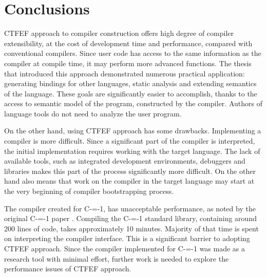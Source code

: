 \section{Conclusions}

CTFEF approach to compiler construction offers high degree of compiler extensibility, at the cost of development time and performance, compared with conventional compilers.
Since user code has access to the same information as the compiler at compile time, it may perform more advanced functions.
The thesis that introduced this approach \cite{grabski2020} demonstrated numerous practical application: generating bindings for other languages, static analysis and extending semantics of the language.
These goals are significantly easier to accomplish, thanks to the access to semantic model of the program, constructed by the compiler.
Authors of language tools do not need to analyze the user program.

On the other hand, using CTFEF approach has some drawbacks. Implementing a compiler is more difficult.
Since a significant part of the compiler is interpreted, the initial implementation requires working with the target language.
The lack of available tools, such as integrated development environments, debuggers and libraries makes this part of the process significantly more difficult.
On the other hand also means that work on the compiler in the target language may start at the very beginning of compiler bootstrapping process\cite{puntambekar:compiler_design, novillo2007gcc}.

The compiler created for C-=-1, has unacceptable performance, as noted by the original C-=-1 paper \cite{grabski2022compilation}.
Compiling the C-=-1 standard library, containing around 200 lines of code, takes approximately 10 minutes.
Majority of that time is spent on interpreting the compiler interface.
This is a significant barrier to adopting CTFEF approach.
Since the compiler implemented for C-=-1 was made as a research tool with minimal effort, further work is needed to explore the performance issues of CTFEF approach.
